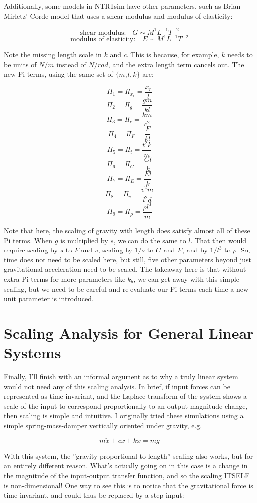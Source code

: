 \documentclass[12pt,letterpaper]{article}
\begin{document}
Additionally, some models in NTRTsim have other parameters, such as Brian Mirletz' Corde model that uses a shear modulus and modulus of elasticity:

\[
\text{shear modulus:} \quad G \sim M^1 L^{-1} T^{-2}
\]
\[
\text{modulus of elasticity:} \quad E \sim M^1 L^{-1} T^{-2}
\]

Note the missing length scale in $k$ and $c$. 
This is because, for example, $k$ needs to be units of $N/m$ instead of $N/rad$, and the extra length term cancels out.
The new Pi terms, using the same set of $\{m,l,k\}$ are:

\[
\Pi_1 = \Pi_{x_r} = \frac{x_r}{l}
\]
\[
\Pi_2 = \Pi_{g} = \frac{gm}{kl}
\]
\[
\Pi_3 = \Pi_{c} = \frac{km}{c^2}
\]
\[
\Pi_4 = \Pi_{F} = \frac{F}{kl}
\]
\[
\Pi_5 = \Pi_{t} = \frac{t^{2}k}{m}
\]
\[
\Pi_6 = \Pi_G = \frac{Gl}{k}
\]
\[
\Pi_7 = \Pi_E = \frac{El}{k}
\]
\[
\Pi_8 = \Pi_v = \frac{v^2 m}{l^2 d}
\]
\[
\Pi_9 = \Pi_{\rho} = \frac{\rho l^3}{m}
\]

Note that here, the scaling of gravity with length does satisfy almost all of these Pi terms.
When $g$ is multiplied by $s$, we can do the same to $l$.
That then would require scaling by $s$ to $F$ and $v$, scaling by $1/s$ to $G$ and $E$, and by $1/l^3$ to $\rho$.
So, time does not need to be scaled here, but still, five other parameters beyond just gravitational acceleration need to be scaled.
The takeaway here is that without extra Pi terms for more parameters like $k_{\theta}$, we can get away with this simple scaling, but we need to be careful and re-evaluate our Pi terms each time a new unit parameter is introduced.

\section{Scaling Analysis for General Linear Systems}

Finally, I'll finish with an informal argument as to why a truly linear system would not need any of this scaling analysis.
In brief, if input forces can be represented as time-invariant, and the Laplace transform of the system shows a scale of the input to correspond proportionally to an output magnitude change, then scaling is simple and intuitive.
I originally tried these simulations using a simple spring-mass-damper vertically oriented under gravity, e.g.

\[
m \ddot x + c \dot x + k x = mg
\]

With this system, the ''gravity proportional to length'' scaling also works, but for an entirely different reason.
What's actually going on in this case is a change in the magnitude of the input-output transfer function, and so the scaling ITSELF is non-dimensional!
One way to see this is to notice that the gravitational force is time-invariant, and could thus be replaced by a step input:
\end{document}
